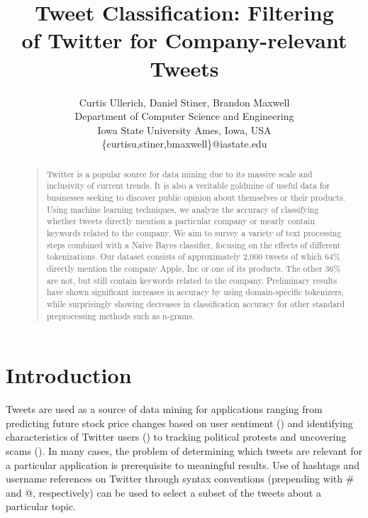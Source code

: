 \documentclass[letterpaper]{article}
\begin{document}
\title{Tweet Classification: Filtering \\ of Twitter for Company-relevant Tweets}
\author{
Curtis Ullerich, Daniel Stiner, Brandon Maxwell\\
Department of Computer Science and Engineering\\
Iowa State University
Ames, Iowa, USA\\
\{curtisu,stiner,bmaxwell\}@iastate.edu\\
}
\maketitle
\begin{abstract}
\begin{quote}
Twitter is a popular source for data mining due to its massive scale and inclusivity of current trends.
It is also a veritable goldmine of useful data for businesses seeking to discover public opinion about themselves or their products.
Using machine learning techniques, we analyze the accuracy of classifying whether tweets directly mention a particular company or mearly contain keywords related to the company.
We aim to survey a variety of text processing steps combined with a Naive Bayes classifier, focusing on the effects of different tokenizations.
Our dataset consists of approximately 2,000 tweets of which 64\% directly mention the company Apple, Inc or one of its products. The other 36\% are not, but still contain keywords related to the company.
Preliminary results have shown significant increases in accuracy %
by using domain-specific tokenizers, while surprisingly showing decreases in classification accuracy for other standard preprocessing methods such as n-grams.%
\end{quote}
\end{abstract}

\section{Introduction}
Tweets are used as a source of data mining for applications ranging from predicting future stock price changes based on user sentiment (\citeauthor{Ruiz}) and identifying characteristics of Twitter users (\citeauthor{conf/icwsm/PennacchiottiP11}) to tracking political protests and uncovering scams (\citeauthor{ICWSM101540}).
In many cases, the problem of determining which tweets are relevant for a particular application is prerequisite to meaningful results. Use of hashtags and username references on Twitter through syntax conventions (prepending with \# and @, respectively) can be used to select a subset of the tweets about a particular topic. 
\end{document}
